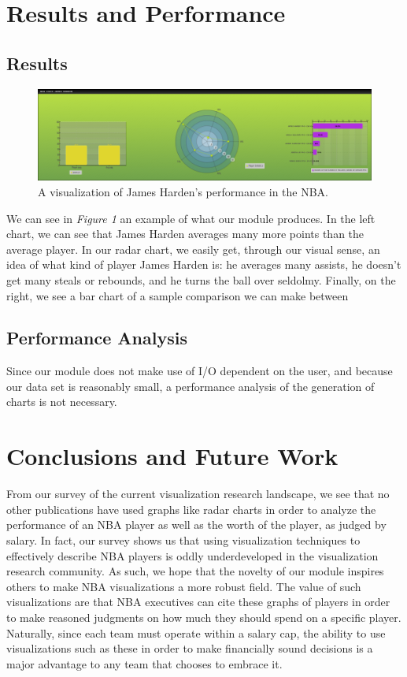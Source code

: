 \documentclass[journal]{vgtc}                %
\begin{document}
\section{Results and Performance}
\subsection{Results}
\begin{figure}[h]
\caption{A visualization of James Harden's performance in the NBA.}
\includegraphics[width=\linewidth]{JamesHarden.png}
\end{figure}
We can see in \emph{Figure 1} an example of what our module produces. In the left chart, we can see that James Harden averages many more points than the average player. In our radar chart, we easily get, through our visual sense, an idea of what kind of player James Harden is: he averages many assists, he doesn't get many steals or rebounds, and he turns the ball over seldolmy. Finally, on the right, we see a bar chart of a sample comparison we can make between 
\subsection{Performance Analysis}
Since our module does not make use of I/O dependent on the user, and because our data set is reasonably small, a performance analysis of the generation of charts is not necessary.
\section{Conclusions and Future Work}
From our survey of the current visualization research landscape, we see that no other publications have used graphs like radar charts in order to analyze the performance of an NBA player as well as the worth of the player, as judged by salary. In fact, our survey shows us that using visualization techniques to effectively describe NBA players is oddly underdeveloped in the visualization research community. As such, we hope that the novelty of our module inspires others to make NBA visualizations a more robust field. The value of such visualizations are that NBA executives can cite these graphs of players in order to make reasoned judgments on how much they should spend on a specific player. Naturally, since each team must operate within a salary cap, the ability to use visualizations such as these in order to make financially sound decisions is a major advantage to any team that chooses to embrace it.
\end{document}
